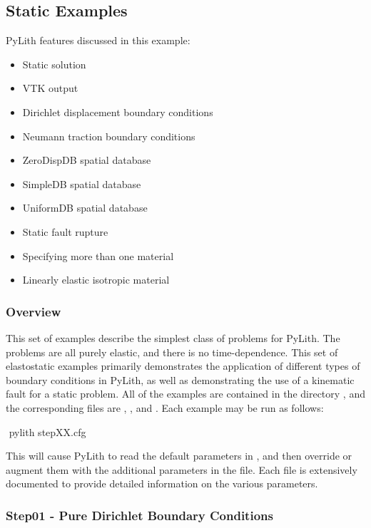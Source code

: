 \subsection{Static Examples}
\label{sec:example:3dhex8-static}

PyLith features discussed in this example:
\begin{itemize}
\item Static solution
\item VTK output
\item Dirichlet displacement boundary conditions
\item Neumann traction boundary conditions
\item ZeroDispDB spatial database
\item SimpleDB spatial database
\item UniformDB spatial database
\item Static fault rupture
\item Specifying more than one material
\item Linearly elastic isotropic material
\end{itemize}

\subsubsection{Overview}

This set of examples describe the simplest class of problems for PyLith.
The problems are all purely elastic, and there is no time-dependence.
This set of elastostatic examples primarily demonstrates the application
of different types of boundary conditions in PyLith, as well as demonstrating
the use of a kinematic fault for a static problem. All of the examples
are contained in the directory , and the
corresponding  files are , ,
and . Each example may be run as follows:
\begin{shell}
$$ pylith stepXX.cfg
\end{shell}
This will cause PyLith to read the default parameters in ,
and then override or augment them with the additional parameters in
the  file. Each  file is extensively
documented to provide detailed information on the various parameters.


\subsubsection{Step01 - Pure Dirichlet Boundary Conditions}

